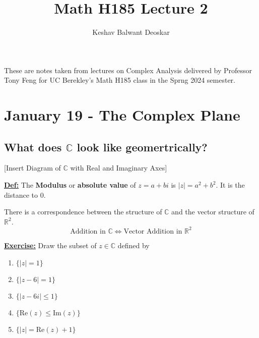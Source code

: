 \documentclass{article}
\title{Math H185 Lecture 2}
\author{Keshav Balwant Deoskar}
\newcommand{\R}{\mathbb{R}}
\newcommand{\C}{\mathbb{C}}
\newcommand{\defn}{\underline{\textbf{Def:}}}
\begin{document}
\maketitle

These are notes taken from lectures on Complex Analysis delivered by Professor Tony Feng for UC Berekley's Math H185 class in the Sprng 2024 semester.

\tableofcontents

\pagebreak

\section{January 19 - The Complex Plane}

\vskip 0.5cm

\subsection{What does $\C$ look like geomertrically?}

[Insert Diagram of $\C$ with Real and Imaginary Axes]

\vskip 0.5cm
\defn\; The \textbf{Modulus} or \textbf{absolute value} of $z = a + bi$ is $|z| = a^2 + b^2$. It is the distance to $0$.

\vskip 0.5cm
There is a correspondence between the structure of $\C$ and the vector structure of $\R^2$.
\[ \text{Addition in $\C$} \iff \text{Vector Addition in $\R^2$} \]

\vskip 0.5cm
\underline{\textbf{Exercise:}} Draw the subset of $z \in \C$ defined by 
\begin{enumerate}
  \item $\{ |z| = 1 \}$
  \item $\{ |z - 6| = 1 \}$
  \item $\{ |z - 6i| \leq 1 \}$
  \item $\{ \text{Re}(z) \leq \text{Im}(z) \}$
  \item $\{ |z| = \text{Re}(z) + 1 \}$
\end{enumerate}
\end{document}
